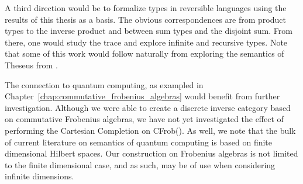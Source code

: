 A third direction would be to formalize types in reversible languages using the results of this
thesis as a basis. The obvious correspondences are from product types to the inverse product and
between sum types and the disjoint sum. From there, one would study the trace and explore infinite
and recursive types. Note that some of this work would follow naturally from exploring the semantics
of Theseus from \cite{james2013isomorphic,james2012information}.

The connection to quantum computing, as exampled in
Chapter~\ref{chap:commutative_frobenius_algebras} would benefit from further investigation. Although
we were able to create a discrete inverse category based on commutative Frobenius algebras, we have
not yet investigated the effect of performing the Cartesian Completion on CFrob(\X). As well, we
note that the bulk of current literature on semantics of quantum computing is based on finite
dimensional Hilbert spaces. Our construction on Frobenius algebras is not limited to the finite
dimensional case, and as such, may be of use when considering infinite dimensions.


